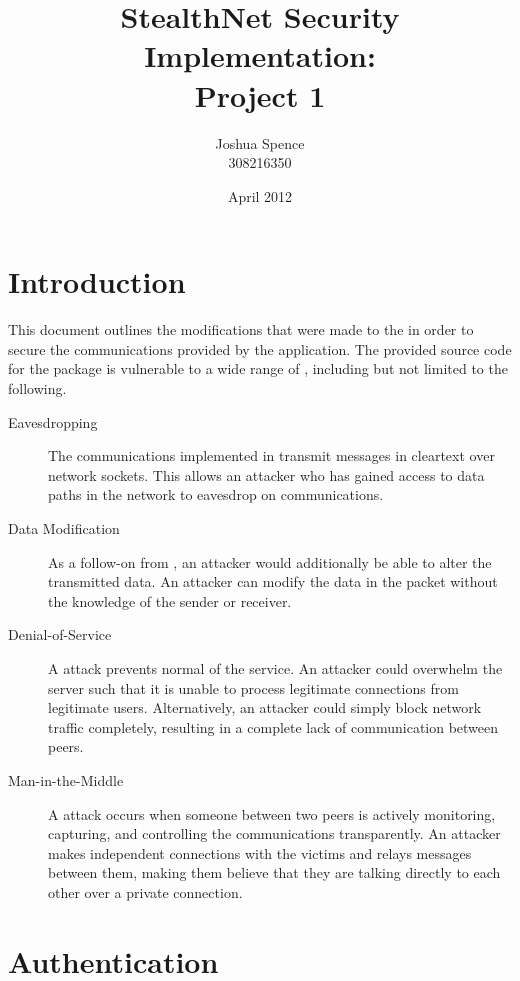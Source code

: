 \documentclass[a4paper,11pt]{article}
\title{StealthNet Security Implementation: \\ Project 1}
\author{Joshua Spence \\ 308216350}
\date{April 2012}
\begin{document}
\maketitle

\section{Introduction}
This document outlines the modifications that were made to the \packageName{} in
order to secure the communications provided by the application. The provided
source code for the \packageName{} package is vulnerable to a wide range of
, including but not limited to the following.

\begin{description}

\item[Eavesdropping] The communications implemented in \packageName{} transmit
messages in cleartext over network sockets. This allows an attacker who has
gained access to data paths in the network to eavesdrop on \packageName{}
communications.

\item[Data Modification] As a follow-on from , an
attacker would additionally be able to alter the transmitted data. An attacker
can modify the data in the packet without the knowledge of the sender or
receiver.

\item[Denial-of-Service] A  attack prevents normal
of the \serviceName{} service. An attacker could overwhelm the \serviceName{}
server such that it is unable to process legitimate connections from legitimate
users. Alternatively, an attacker could simply block network traffic completely,
resulting in a complete lack of communication between \serviceName{} peers.

\item[Man-in-the-Middle] A  attack occurs when
someone between two \serviceName{} peers is actively monitoring, capturing, and
controlling the communications transparently. An attacker makes independent
connections with the victims and relays messages between them, making them
believe that they are talking directly to each other over a private connection.

\end{description}

\section{Authentication}
\end{document}
